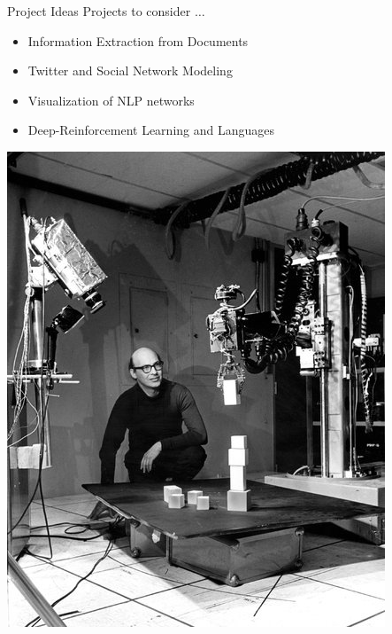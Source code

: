 \documentclass{beamer}
\begin{document}
\begin{frame}{Project Ideas}
  Projects to consider $\ldots$
  \begin{itemize}
  \item Information Extraction from Documents
  \item Twitter and Social Network Modeling
  \item Visualization of NLP networks
  \item Deep-Reinforcement Learning and Languages
  \end{itemize}
\end{frame}

\begin{frame}{}
  \begin{center}
    \includegraphics[height=\textheight]{minsky}
  \end{center}
\end{frame}
\end{document}
